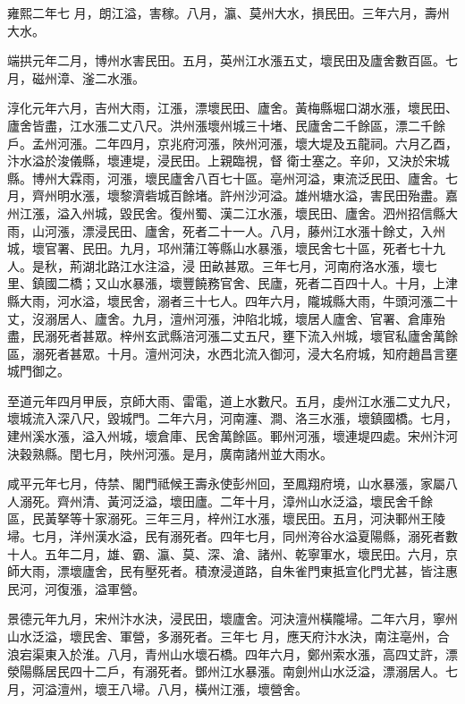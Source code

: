 \begin{pinyinscope}
 雍熙二年七
 月，朗江溢，害稼。八月，瀛、莫州大水，損民田。三年六月，壽州大水。



 端拱元年二月，博州水害民田。五月，英州江水漲五丈，壞民田及廬舍數百區。七月，磁州漳、滏二水漲。



 淳化元年六月，吉州大雨，江漲，漂壞民田、廬舍。黃梅縣堀口湖水漲，壞民田、廬舍皆盡，江水漲二丈八尺。洪州漲壞州城三十堵、民廬舍二千餘區，漂二千餘戶。孟州河漲。二年四月，京兆府河漲，陜州河漲，壞大堤及五龍祠。六月乙酉，汴水溢於浚儀縣，壞連堤，浸民田。上親臨視，督
 衛士塞之。辛卯，又決於宋城縣。博州大霖雨，河漲，壞民廬舍八百七十區。亳州河溢，東流泛民田、廬舍。七月，齊州明水漲，壞黎濟砦城百餘堵。許州沙河溢。雄州塘水溢，害民田殆盡。嘉州江漲，溢入州城，毀民舍。復州蜀、漢二江水漲，壞民田、廬舍。泗州招信縣大雨，山河漲，漂浸民田、廬舍，死者二十一人。八月，藤州江水漲十餘丈，入州城，壞官署、民田。九月，邛州蒲江等縣山水暴漲，壞民舍七十區，死者七十九人。是秋，荊湖北路江水注溢，浸
 田畝甚眾。三年七月，河南府洛水漲，壞七里、鎮國二橋；又山水暴漲，壞豐饒務官舍、民廬，死者二百四十人。十月，上津縣大雨，河水溢，壞民舍，溺者三十七人。四年六月，隴城縣大雨，牛頭河漲二十丈，沒溺居人、廬舍。九月，澶州河漲，沖陷北城，壞居人廬舍、官署、倉庫殆盡，民溺死者甚眾。梓州玄武縣涪河漲二丈五尺，壅下流入州城，壞官私廬舍萬餘區，溺死者甚眾。十月。澶州河決，水西北流入御河，浸大名府城，知府趙昌言壅城門御之。



 至道元年四月甲辰，京師大雨、雷電，道上水數尺。五月，虔州江水漲二丈九尺，壞城流入深八尺，毀城門。二年六月，河南瀍、澗、洛三水漲，壞鎮國橋。七月，建州溪水漲，溢入州城，壞倉庫、民舍萬餘區。鄆州河漲，壞連堤四處。宋州汴河決穀熟縣。閏七月，陜州河漲。是月，廣南諸州並大雨水。



 咸平元年七月，侍禁、閣門祗候王壽永使彭州回，至鳳翔府境，山水暴漲，家屬八人溺死。齊州清、黃河泛溢，壞田廬。二年十月，漳州山水泛溢，壞民舍千餘
 區，民黃拏等十家溺死。三年三月，梓州江水漲，壞民田。五月，河決鄆州王陵埽。七月，洋州漢水溢，民有溺死者。四年七月，同州洿谷水溢夏陽縣，溺死者數十人。五年二月，雄、霸、瀛、莫、深、滄、諸州、乾寧軍水，壞民田。六月，京師大雨，漂壞廬舍，民有壓死者。積潦浸道路，自朱雀門東抵宣化門尤甚，皆注惠民河，河復漲，溢軍營。



 景德元年九月，宋州汴水決，浸民田，壞廬舍。河決澶州橫隴埽。二年六月，寧州山水泛溢，壞民舍、軍營，多溺死者。三年七
 月，應天府汴水決，南注亳州，合浪宕渠東入於淮。八月，青州山水壞石橋。四年六月，鄭州索水漲，高四丈許，漂滎陽縣居民四十二戶，有溺死者。鄧州江水暴漲。南劍州山水泛溢，漂溺居人。七月，河溢澶州，壞王八埽。八月，橫州江漲，壞營舍。




\end{pinyinscope}
